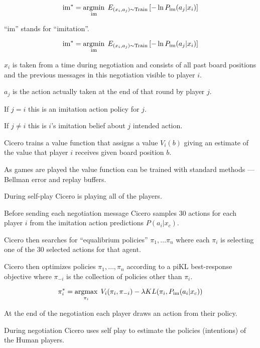 {\vfill
$$\mathrm{im}^* = \operatorname*{argmin}_{\mathrm{im}}\;E_{(x_i,a_j) \sim \mathrm{Train}}\left[-\ln P_{\mathrm{im}}(a_j|x_i)\right]$$

\vfill
``im'' stands for ``imitation''.


$$\mathrm{im}^* = \operatorname*{argmin}_{\mathrm{im}}\;E_{(x_i,a_j) \sim \mathrm{Train}}\left[-\ln P_{\mathrm{im}}(a_j|x_i)\right]$$

\vfill
$x_i$ is taken from a time during negotiation and
consists of all past board positions and the previous messages in this negotiation visible to player $i$.

\vfill
$a_j$ is the action actually taken at the end of that round by player $j$.

\vfill
If $j = i$ this is an imitation action policy for $j$.

\vfill
If $j \ne i$ this is $i$'s imitation belief about $j$ intended action.



Cicero trains a value function that assigns a value $V_i(b)$ giving an estimate of the value that player $i$ receives 
given board position $b$.

\vfill
As games are played the value function can be trained with standard methods --- Bellman error and replay buffers.


During self-play Cicero is playing all of the players.

\vfill
Before sending each negotiation message Cicero samples 30 actions for each player $i$
from the imitation action predictions $P(a_i|x_c)$.

\vfill
Cicero then searches for ``equalibrium policies'' $\pi_1,\ldots \pi_n$ where each $\pi_i$ is selecting one of the 30 selected actions for that agent.


Cicero then optimizes policies $\pi_1,\ldots,\pi_n$ according to a piKL best-response objective
where $\pi_{-i}$ is the collection of policies other than $\pi_i$.

\vfill
$$\pi_i^* = \operatorname*{argmax}_{\pi_i}\;V_i(\pi_i,\pi_{-i}) - \lambda KL(\pi_i,P_{\mathrm{im}}(a_i|x_c))$$

\vfill
At the end of the negotiation each player draws an action from their policy.


During negotiation
Cicero uses self play to estimate the policies (intentions) of the Human players.


}
